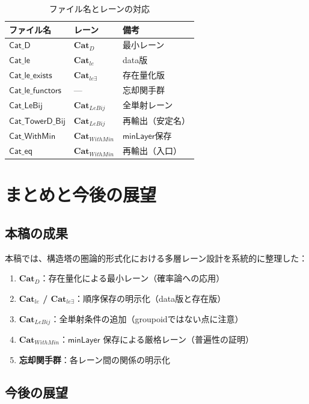 \documentclass[a4paper,11pt]{ltjsarticle}
\theoremstyle{definition}
\theoremstyle{plain}
\newcommand{\CatD}{\mathbf{Cat}_D}
\newcommand{\Catle}{\mathbf{Cat}_{le}}
\newcommand{\CatleE}{\mathbf{Cat}_{le\exists}}
\newcommand{\CatLeBij}{\mathbf{Cat}_{LeBij}}
\newcommand{\CatWithMin}{\mathbf{Cat}_{WithMin}}
\newcommand{\minLayer}{\mathsf{minLayer}}
\begin{document}
\begin{table}[htbp]
\centering
\caption{ファイル名とレーンの対応}
\begin{tabular}{lll}
\toprule
ファイル名 & レーン & 備考 \\
\midrule
$\mathsf{Cat\_D}$ & $\CatD$ & 最小レーン \\
$\mathsf{Cat\_le}$ & $\Catle$ & data版 \\
$\mathsf{Cat\_le\_exists}$ & $\CatleE$ & 存在量化版 \\
$\mathsf{Cat\_le\_functors}$ & --- & 忘却関手群 \\
$\mathsf{Cat\_LeBij}$ & $\CatLeBij$ & 全単射レーン \\
$\mathsf{Cat\_TowerD\_Bij}$ & $\CatLeBij$ & 再輸出（安定名） \\
$\mathsf{Cat\_WithMin}$ & $\CatWithMin$ & $\minLayer$保存 \\
$\mathsf{Cat\_eq}$ & $\CatWithMin$ & 再輸出（入口） \\
\bottomrule
\end{tabular}
\end{table}

\section{まとめと今後の展望}

\subsection{本稿の成果}

本稿では、構造塔の圏論的形式化における多層レーン設計を系統的に整理した：

\begin{enumerate}
  \item \textbf{$\CatD$}：存在量化による最小レーン（確率論への応用）
  \item \textbf{$\Catle$ / $\CatleE$}：順序保存の明示化（data版と存在版）
  \item \textbf{$\CatLeBij$}：全単射条件の追加（groupoidではない点に注意）
  \item \textbf{$\CatWithMin$}：$\minLayer$ 保存による厳格レーン（普遍性の証明）
  \item \textbf{忘却関手群}：各レーン間の関係の明示化
\end{enumerate}

\subsection{今後の展望}
\end{document}
